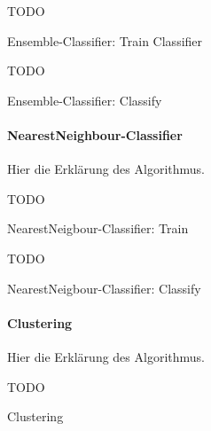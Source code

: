 \begin{algorithm}[H]
	\vspace{0.2cm}
	TODO
	\caption{Ensemble-Classifier: Train Classifier}
	\label{alg:ensemble_train}
	\vspace{0.2cm}
\end{algorithm}

\begin{algorithm}[H]
	\vspace{0.2cm}
	TODO
	\caption{Ensemble-Classifier: Classify}
	\label{alg:ensemble_calc}
	\vspace{0.2cm}
\end{algorithm}

\paragraph{NearestNeighbour-Classifier}
Hier die Erklärung des Algorithmus.

\begin{algorithm}[H]
	\vspace{0.2cm}
	TODO
	\caption{NearestNeigbour-Classifier: Train}
	\label{alg:nearest_neighbour_train}
	\vspace{0.2cm}
\end{algorithm}

\begin{algorithm}[H]
	\vspace{0.2cm}
	TODO
	\caption{NearestNeigbour-Classifier: Classify}
	\label{alg:nearest_neighbour_calc}
	\vspace{0.2cm}
\end{algorithm}

\paragraph{Clustering}
Hier die Erklärung des Algorithmus.

\begin{algorithm}[H]
	\vspace{0.2cm}
	TODO
	\caption{Clustering}
	\label{alg:cluster}
	\vspace{0.2cm}
\end{algorithm}
